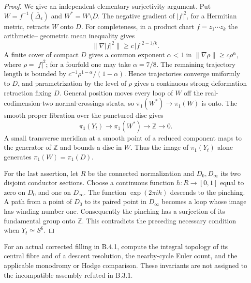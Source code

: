 \begin{proof}
We give an independent elementary
surjectivity argument. Put
$W=f^{-1}(\overline\Delta_\epsilon)$
and $W^*=W\setminus D$. The negative
gradient of $|f|^2$, for a Hermitian
metric, retracts $W$ onto $D$.
For completeness, in a product chart
$f=z_1\cdots z_k$ the arithmetic--
geometric mean inequality gives
\[
 \|\nabla |f|^2\|
   \ge c\,|f|^{2-1/k}.
\]
A finite cover of compact $D$ gives
a common exponent $\alpha<1$ in
$\|\nabla\rho\|\ge c\rho^\alpha$,
where $\rho=|f|^2$; for a fourfold
one may take $\alpha=7/8$.
The remaining trajectory length is
bounded by
$c^{-1}\rho^{1-\alpha}/(1-\alpha)$.
Hence trajectories converge uniformly
to $D$, and parametrization by the
level of $\rho$ gives a continuous
strong deformation retraction fixing
$D$. General position moves every
loop of $W$ off the real-codimension-two
normal-crossings strata, so
$\pi_1(W^*)\to\pi_1(W)$ is onto.
The smooth proper fibration over the
punctured disc gives
\[
 \pi_1(Y_t)\longrightarrow\pi_1(W^*)
       \longrightarrow\mathbb Z\longrightarrow0.
\]
A small transverse meridian at a
smooth point of a reduced component
maps to the generator of $\mathbb Z$
and bounds a disc in $W$.
Thus the image of $\pi_1(Y_t)$ alone
generates $\pi_1(W)=\pi_1(D)$.

For the last assertion, let $R$ be
the connected normalization and
$D_0,D_\infty$ its two disjoint
conductor sections. Choose a
continuous function $h:R\to[0,1]$
equal to zero on $D_0$ and one on
$D_\infty$. The function
$\exp(2\pi i h)$ descends to the
pinching. A path from a point of
$D_0$ to its paired point in
$D_\infty$ becomes a loop whose
image has winding number one.
Consequently the pinching has a
surjection of its fundamental group
onto $\mathbb Z$. This contradicts
the preceding necessary condition
when $Y_t\simeq S^6$.
\end{proof}
















\begin{problem}[B.5.1; Open]\label{push:B51}
For an actual corrected filling in B.4.1,
compute the integral topology of its
central fibre and of a descent resolution,
the nearby-cycle Euler count, and the
applicable monodromy or Hodge comparison.
These invariants are not assigned to the
incompatible assembly refuted in B.3.1.
\end{problem}
